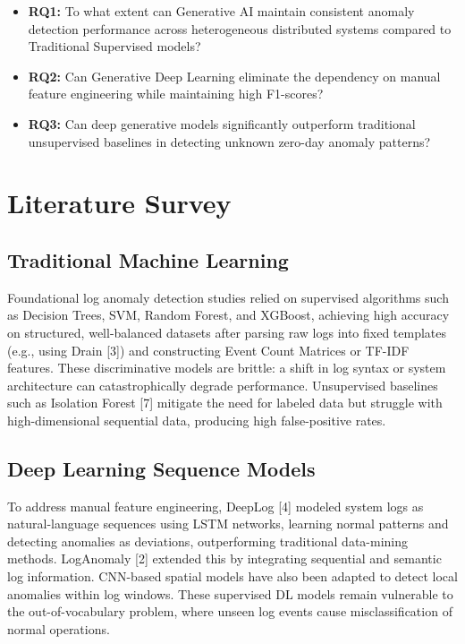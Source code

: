 \documentclass[conference]{IEEEtran}
\begin{document}
\begin{itemize}
    \item \textbf{RQ1:} To what extent can Generative AI maintain consistent anomaly detection performance across heterogeneous distributed systems compared to Traditional Supervised models?
    \item \textbf{RQ2:} Can Generative Deep Learning eliminate the dependency on manual feature engineering while maintaining high F1-scores?
    \item \textbf{RQ3:} Can deep generative models significantly outperform traditional unsupervised baselines in detecting unknown zero-day anomaly patterns?
\end{itemize}

\section{Literature Survey}

\subsection{Traditional Machine Learning}
Foundational log anomaly detection studies relied on supervised algorithms such as Decision Trees, SVM, Random Forest, and XGBoost, achieving high accuracy on structured, well-balanced datasets after parsing raw logs into fixed templates (e.g., using Drain [3]) and constructing Event Count Matrices or TF-IDF features. These discriminative models are brittle: a shift in log syntax or system architecture can catastrophically degrade performance. Unsupervised baselines such as Isolation Forest [7] mitigate the need for labeled data but struggle with high-dimensional sequential data, producing high false-positive rates.

\subsection{Deep Learning Sequence Models}
To address manual feature engineering, DeepLog [4] modeled system logs as natural-language sequences using LSTM networks, learning normal patterns and detecting anomalies as deviations, outperforming traditional data-mining methods. LogAnomaly [2] extended this by integrating sequential and semantic log information. CNN-based spatial models have also been adapted to detect local anomalies within log windows. These supervised DL models remain vulnerable to the out-of-vocabulary problem, where unseen log events cause misclassification of normal operations.
\end{document}
